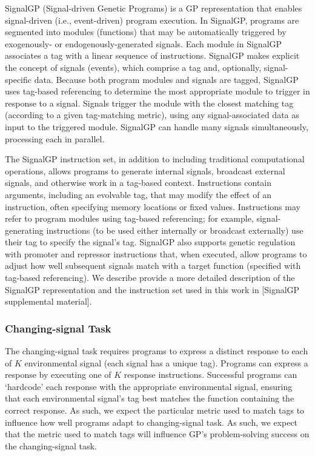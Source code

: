 SignalGP (Signal-driven Genetic Programs) is a GP representation that enables signal-driven (i.e., event-driven) program execution.
In SignalGP, programs are segmented into modules (functions) that may be automatically triggered by exogenously- or endogenously-generated signals.
Each module in SignalGP associates a tag with a linear sequence of instructions.
SignalGP makes explicit the concept of signals (events), which comprise a tag and, optionally, signal-specific data.
Because both program modules and signals are tagged, SignalGP uses tag-based referencing to determine the most appropriate module to trigger in response to a signal.
Signals trigger the module with the closest matching tag (according to a given tag-matching metric), using any signal-associated data as input to the triggered module.
SignalGP can handle many signals simultaneously, processing each in parallel.

The SignalGP instruction set, in addition to including traditional computational operations, allows programs to generate internal signals, broadcast external signals, and otherwise work in a tag-based context.
Instructions contain arguments, including an evolvable tag, that may modify the effect of an instruction, often specifying memory locations or fixed values.
Instructions may refer to program modules using tag-based referencing; for example, signal-generating instructions (to be used either internally or broadcast externally) use their tag to specify the signal's tag.
SignalGP also supports genetic regulation with promoter and repressor instructions that, when executed, allow programs to adjust how well subsequent signals match with a target function (specified with tag-based referencing).
We describe provide a more detailed description of the SignalGP representation and the instruction set used in this work in [SignalGP supplemental material].

\subsubsection{Changing-signal Task}

The changing-signal task requires programs to express a distinct response
to each of $K$ environmental signal (each signal has a unique tag).
Programs can express a response by executing one of $K$ response instructions.
Successful programs can `hardcode' each response with the appropriate environmental signal, ensuring that each environmental signal's tag best matches the function containing the correct response.
As such, we expect the particular metric used to match tags to influence how well programs adapt to changing-signal task.
As such, we expect that the metric used to match tags will influence GP's problem-solving success on the changing-signal task.

